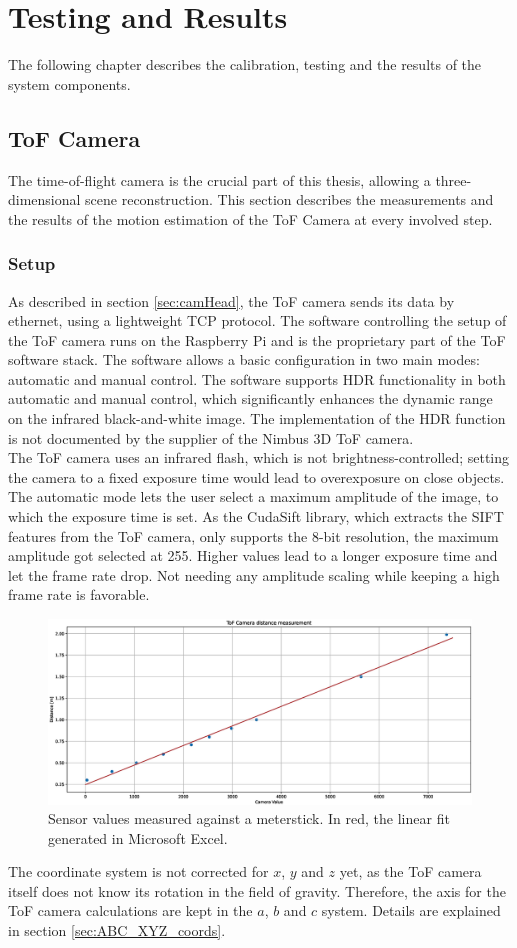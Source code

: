 \chapter{Testing and Results}
\label{sec:Results}
The following chapter describes the calibration, testing and the results of the system components. 
\section{ToF Camera}
The time-of-flight camera is the crucial part of this thesis, allowing a three-dimensional scene reconstruction. This section describes the measurements and the results of the motion estimation of the ToF Camera at every involved step.
\subsection{Setup}
As described in section \ref{sec:camHead}, the ToF camera sends its data by ethernet, using a lightweight TCP protocol. The software controlling the setup of the ToF camera runs on the Raspberry Pi and is the proprietary part of the ToF software stack. The software allows a basic configuration in two main modes: automatic and manual control. The software supports HDR functionality in both automatic and manual control, which significantly enhances the dynamic range on the infrared black-and-white image. The implementation of the HDR function is not documented by the supplier of the Nimbus 3D ToF camera.\\ 
The ToF camera uses an infrared flash, which is not brightness-controlled; setting the camera to a fixed exposure time would lead to overexposure on close objects. The automatic mode lets the user select a maximum amplitude of the image, to which the exposure time is set. As the CudaSift library, which extracts the SIFT features from the ToF camera, only supports the 8-bit resolution, the maximum amplitude got selected at 255. Higher values lead to a longer exposure time and let the frame rate drop. Not needing any amplitude scaling while keeping a high frame rate is favorable. 
\begin{figure}[H]
    \centering
    \includegraphics[width=1.0\textwidth]{images/camera_distance_measurement.eps}
    \caption{Sensor values measured against a meterstick. In red, the linear fit generated in Microsoft Excel.}
    \label{im:distance_measurement}
\end{figure}
The coordinate system is not corrected for $x$, $y$ and $z$ yet, as the ToF camera itself does not know its rotation in the field of gravity. Therefore, the axis for the ToF camera calculations are kept in the $a$, $b$ and $c$ system. Details are explained in section \ref{sec:ABC_XYZ_coords}.
